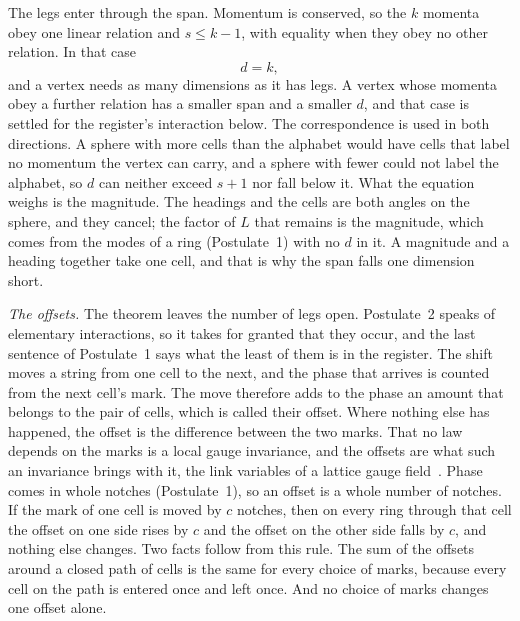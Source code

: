 \documentclass[aps,prd,twocolumn,superscriptaddress,nofootinbib]{revtex4-2}
\begin{document}
The legs enter through the span. Momentum is conserved, so the $k$ momenta obey one linear relation and $s \le k-1$, with equality when they obey no other relation. In that case
\begin{equation}
d = k ,
\label{eq:nk}
\end{equation}
and a vertex needs as many dimensions as it has legs. A vertex whose momenta obey a further relation has a smaller span and a smaller $d$, and that case is settled for the register's interaction below. The correspondence is used in both directions. A sphere with more cells than the alphabet would have cells that label no momentum the vertex can carry, and a sphere with fewer could not label the alphabet, so $d$ can neither exceed $s+1$ nor fall below it. What the equation weighs is the magnitude. The headings and the cells are both angles on the sphere, and they cancel; the factor of $L$ that remains is the magnitude, which comes from the modes of a ring (Postulate~1) with no $d$ in it. A magnitude and a heading together take one cell, and that is why the span falls one dimension short.

\textit{The offsets.} The theorem leaves the number of legs open. Postulate~2 speaks of elementary interactions, so it takes for granted that they occur, and the last sentence of Postulate~1 says what the least of them is in the register. The shift moves a string from one cell to the next, and the phase that arrives is counted from the next cell's mark. The move therefore adds to the phase an amount that belongs to the pair of cells, which is called their offset. Where nothing else has happened, the offset is the difference between the two marks. That no law depends on the marks is a local gauge invariance, and the offsets are what such an invariance brings with it, the link variables of a lattice gauge field~\cite{peierls1933,wilson1974,kogut1975}. Phase comes in whole notches (Postulate~1), so an offset is a whole number of notches. If the mark of one cell is moved by $c$ notches, then on every ring through that cell the offset on one side rises by $c$ and the offset on the other side falls by $c$, and nothing else changes. Two facts follow from this rule. The sum of the offsets around a closed path of cells is the same for every choice of marks, because every cell on the path is entered once and left once. And no choice of marks changes one offset alone.
\end{document}
